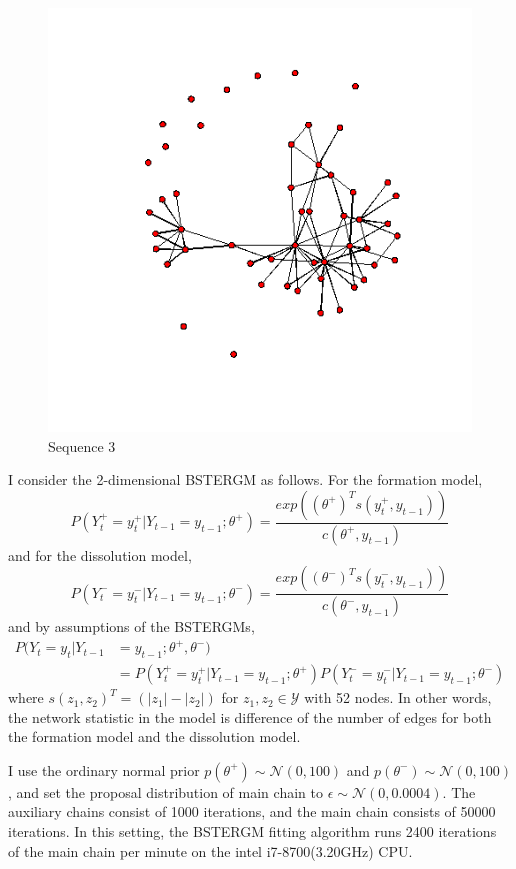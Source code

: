 \documentclass[a4paper, 11pt]{report}
\theoremstyle{definition}
\begin{document}
\begin{figure}[h]
\begin{center}
    \includegraphics[scale=0.26]{pictures/f3_19_nework.png}
    \caption{Sequence 3}
    \end{center}
\end{figure}
\clearpage

I consider the 2-dimensional BSTERGM as follows.
For the formation model,
\[P(Y_t^+=y_t^+|Y_{t-1}=y_{t-1};\theta^+) = \frac{exp((\theta^+)^{T}s(y_t^+, y_{t-1}))}{c(\theta^+, y_{t-1})}\]
and for the dissolution model,
\[P(Y_t^-=y_t^-|Y_{t-1}=y_{t-1};\theta^-) = \frac{exp((\theta^-)^{T}s(y_t^-, y_{t-1}))}{c(\theta^-, y_{t-1})}\]
and by assumptions of the BSTERGMs,
\begin{align*}
    P(Y_t=y_t|Y_{t-1} &= y_{t-1};\theta^+,\theta^-)\\
    &=P(Y_t^+=y_t^+|Y_{t-1}=y_{t-1};\theta^+) P(Y_t^-=y_t^-|Y_{t-1}=y_{t-1};\theta^-)
\end{align*}
where
\(s(z_1,z_2)^T=(|z_1|-|z_2|)\)
for $z_1,z_2\in\mathcal{Y}$ with 52 nodes. In other words, the network statistic in the model is
difference of the number of edges for both the formation model and the dissolution model.

I use the ordinary normal prior $p(\theta^+)\sim\mathcal{N}(0,100)$ and $p(\theta^-)\sim\mathcal{N}(0,100)$,
and set the proposal distribution of main chain to $\epsilon\sim\mathcal{N}(0,0.0004)$.
The auxiliary chains consist of 1000 iterations, and the main chain consists of 50000 iterations.
In this setting, the BSTERGM fitting algorithm runs 2400 iterations of the main chain per minute on the intel i7-8700(3.20GHz) CPU.
\end{document}
